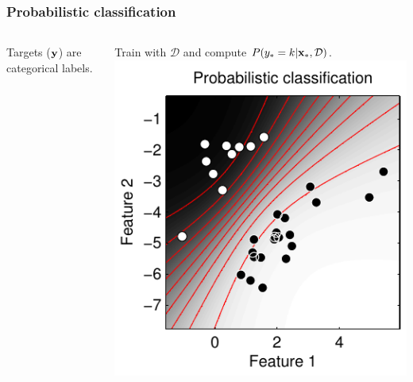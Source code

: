 \begin{frame}
\frametitle{Probabilistic classification}
\begin{columns}
Targets (${\bf y}$) are categorical labels.\par
Train with $\mathcal{D}$ and compute $P(y_*=k | {\bf x}_*, \mathcal{D})$.
\includegraphics[width=\textwidth]{probabilistic_classification}
\end{columns}
\end{frame}

